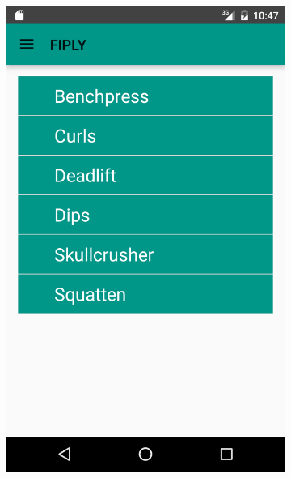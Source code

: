 \documentclass[FIPLY_base.tex]{subfiles}
\begin{document}
\begin{figure}[t]
\begin{subfigure}[h]{0.3\textwidth}
	\includegraphics[scale=0.20]{img/Uebungskatalog}
	\end{subfigure}
	\hfil
	\begin{subfigure}[h]{0.3\textwidth}

\end{subfigure}
\end{figure}
\end{document}
